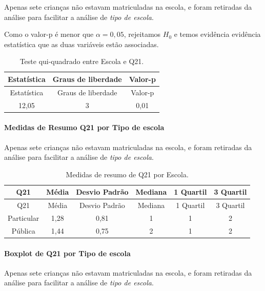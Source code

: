 \documentclass[]{article}
\let\oldparagraph\paragraph
\renewcommand{\paragraph}[1]{\oldparagraph{#1}\mbox{}}
\begin{document}
Apenas sete crianças não estavam matriculadas na escola, e foram retiradas da análise para facilitar a análise de \emph{tipo de escola}.

Como o valor-p é menor que \(\alpha=0,05\), rejeitamos \(H_0\) e temos evidência evidência estatística que as duas variáveis estão associadas.

\begin{longtable}[]{@{}ccc@{}}
\caption{\label{tab:unnamed-chunk-356}Teste qui-quadrado entre Escola e Q21.}\tabularnewline
\toprule
Estatística & Graus de liberdade & Valor-p\tabularnewline
\midrule
\endfirsthead
\toprule
Estatística & Graus de liberdade & Valor-p\tabularnewline
\midrule
\endhead
12,05 & 3 & 0,01\tabularnewline
\bottomrule
\end{longtable}

\cleardoublepage

\hypertarget{medidas-de-resumo-q21-por-tipo-de-escola}{%
\paragraph{Medidas de Resumo Q21 por Tipo de escola}\label{medidas-de-resumo-q21-por-tipo-de-escola}}

Apenas sete crianças não estavam matriculadas na escola, e foram retiradas da análise para facilitar a análise de \emph{tipo de escola}.

\begin{longtable}[]{@{}cccccc@{}}
\caption{\label{tab:unnamed-chunk-357}Medidas de resumo de Q21 por Escola.}\tabularnewline
\toprule
Q21 & Média & Desvio Padrão & Mediana & 1 Quartil & 3 Quartil\tabularnewline
\midrule
\endfirsthead
\toprule
Q21 & Média & Desvio Padrão & Mediana & 1 Quartil & 3 Quartil\tabularnewline
\midrule
\endhead
Particular & 1,28 & 0,81 & 1 & 1 & 2\tabularnewline
Pública & 1,44 & 0,75 & 2 & 1 & 2\tabularnewline
\bottomrule
\end{longtable}

\hypertarget{boxplot-de-q21-por-tipo-de-escola}{%
\paragraph{Boxplot de Q21 por Tipo de escola}\label{boxplot-de-q21-por-tipo-de-escola}}

Apenas sete crianças não estavam matriculadas na escola, e foram retiradas da análise para facilitar a análise de \emph{tipo de escola}.
\end{document}
